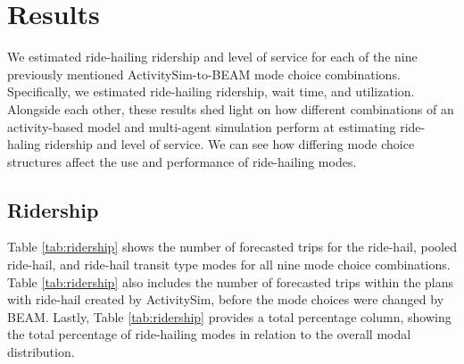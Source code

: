 \documentclass[fancy, masters]{byuthesis}
\begin{document}
\hypertarget{results}{%
\chapter{Results}\label{results}}

We estimated ride-hailing ridership and level of service for each of the nine previously mentioned ActivitySim-to-BEAM mode choice combinations. Specifically, we estimated ride-hailing ridership, wait time, and utilization. Alongside each other, these results shed light on how different combinations of an activity-based model and multi-agent simulation perform at estimating ride-haling ridership and level of service. We can see how differing mode choice structures affect the use and performance of ride-hailing modes.

\hypertarget{res-ridership}{%
\section{Ridership}\label{res-ridership}}

Table \ref{tab:ridership} shows the number of forecasted trips for the ride-hail, pooled ride-hail, and ride-hail transit type modes for all nine mode choice combinations. Table \ref{tab:ridership} also includes the number of forecasted trips within the plans with ride-hail created by ActivitySim, before the mode choices were changed by BEAM. Lastly, Table \ref{tab:ridership} provides a total percentage column, showing the total percentage of ride-hailing modes in relation to the overall modal distribution.
\end{document}
